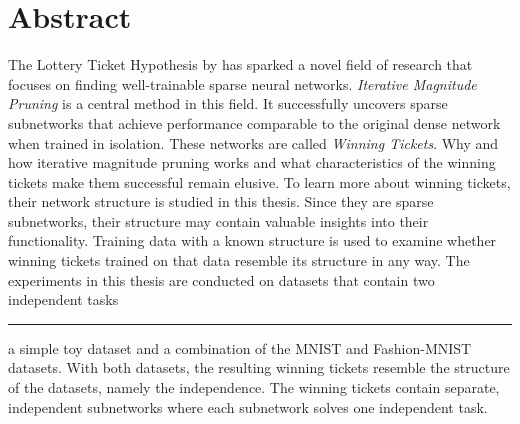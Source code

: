 \chapter*{Abstract}

The Lottery Ticket Hypothesis by \textcite{LTH} has sparked a novel field of research that focuses on finding well-trainable sparse neural networks.
\textit{Iterative Magnitude Pruning} is a central method in this field.
It successfully uncovers sparse subnetworks that achieve performance comparable to the original dense network when trained in isolation. 
These networks are called \textit{Winning Tickets}.
Why and how iterative magnitude pruning works and what characteristics of the winning tickets make them successful remain elusive.
To learn more about winning tickets, their network structure is studied in this thesis.
Since they are sparse subnetworks, their structure may contain valuable insights into their functionality.
Training data with a known structure is used to examine whether winning tickets trained on that data resemble its structure in any way.
The experiments in this thesis are conducted on datasets that contain two independent tasks \rule[0.5ex]{.5em}{0.5pt} a simple toy dataset and a combination of the MNIST and Fashion-MNIST datasets.
With both datasets, the resulting winning tickets resemble the structure of the datasets, namely the independence.
The winning tickets contain separate, independent subnetworks where each subnetwork solves one independent task.
